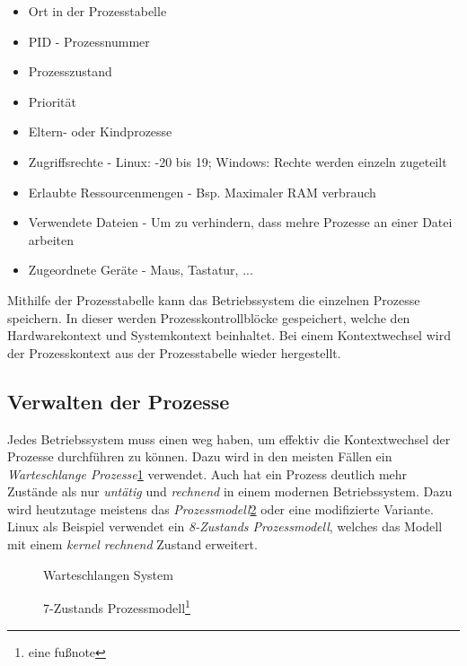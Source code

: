 \begin{itemize}
    \setlength\itemsep{0pt}
    \item Ort in der Prozesstabelle
    \item PID - Prozessnummer
    \item Prozesszustand
    \item Priorität
    \item Eltern- oder Kindprozesse
    \item Zugriffsrechte - Linux: -20 bis 19; Windows: Rechte werden einzeln zugeteilt
    \item Erlaubte Ressourcenmengen - Bsp. Maximaler RAM verbrauch
    \item Verwendete Dateien - Um zu verhindern, dass mehre Prozesse an einer Datei arbeiten
    \item Zugeordnete Geräte - Maus, Tastatur, ...
\end{itemize}

Mithilfe der Prozesstabelle kann das Betriebssystem die einzelnen Prozesse speichern. In dieser werden Prozesskontrollblöcke gespeichert, welche den Hardwarekontext und Systemkontext beinhaltet. Bei einem Kontextwechsel wird der Prozesskontext aus der Prozesstabelle wieder hergestellt.

\newpage

\subsection{Verwalten der Prozesse}

Jedes Betriebssystem muss einen weg haben, um effektiv die Kontextwechsel der Prozesse durchführen zu können. Dazu wird in den meisten Fällen ein \textit{Warteschlange Prozesse}\ref{Warteschlange Prozesse} verwendet. Auch hat ein Prozess deutlich mehr Zustände als nur \textit{untätig} und \textit{rechnend} in einem modernen Betriebssystem. Dazu wird heutzutage meistens das \textit{Prozessmodell}\ref{Prozessmodell} oder eine modifizierte Variante. Linux als Beispiel verwendet ein \textit{8-Zustands Prozessmodell}, welches das Modell mit einem \textit{kernel rechnend} Zustand erweitert.

\begin{figure}[h]
    \centering
    
    \caption{Warteschlangen System\protect\footnotemark}
    \label{Warteschlange Prozesse}
\end{figure}
\begin{figure}[h]
    \centering
    
    \caption{7-Zustands Prozessmodell\protect\footnote{eine fußnote}}
    \label{Prozessmodell}
\end{figure}

